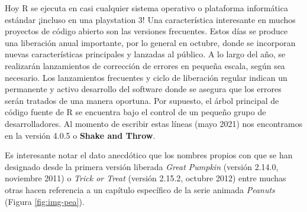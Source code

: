 \documentclass[
]{book}
\begin{document}
Hoy R se ejecuta en casi cualquier sistema operativo o plataforma informática estándar ¡incluso en una playstation 3! Una característica interesante en muchos proyectos de código abierto son las versiones frecuentes. Estos días se produce una liberación anual importante, por lo general en octubre, donde se incorporan nuevas características principales y lanzadas al público. A lo largo del año, se realizarán lanzamientos de corrección de errores en pequeña escala, según sea necesario. Los lanzamientos frecuentes y ciclo de liberación regular indican un permanente y activo desarrollo del software donde se asegura que los errores serán tratados de una manera oportuna. Por supuesto, el árbol principal de código fuente de R se encuentra bajo el control de un pequeño grupo de desarrolladores. Al momento de escribir estas líneas (mayo 2021) nos encontramos en la versión 4.0.5 o \textbf{Shake and Throw}.

Es interesante notar el dato anecdótico que los nombres propios con que se han designado desde la primera versión liberada \emph{Great Pumpkin} (versión 2.14.0, noviembre 2011) o \emph{Trick or Treat} (versión 2.15.2, octubre 2012) entre muchas otras hacen referencia a un capítulo específico de la serie animada \emph{Peanuts} (Figura \ref{fig:img-pea}).
\end{document}
